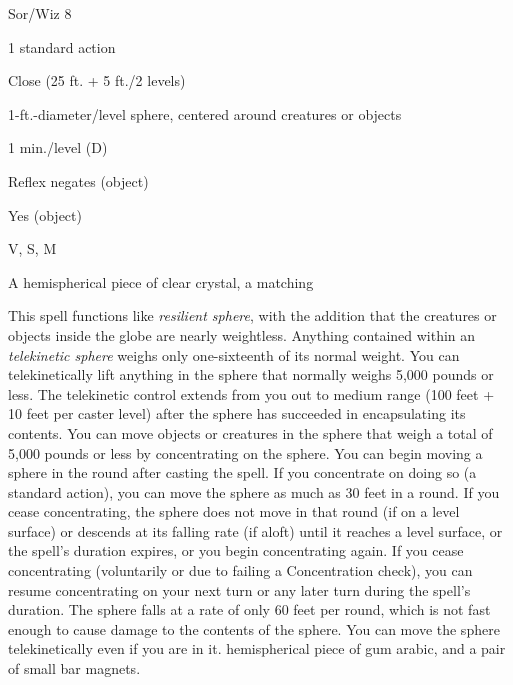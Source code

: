 
\begin{description*}
\item[Level:] Sor/Wiz 8
\item[Casting Time:] 1 standard action
\item[Range:] Close (25 ft. + 5 ft./2 levels)
\item[Effect:] 1-ft.-diameter/level sphere, centered around creatures or objects
\item[Duration:] 1 min./level (D)
\item[Saving Throw:] Reflex negates (object)
\item[Spell Resistance:] Yes (object)
\item[Components:] V, S, M
\item[Arcane Material Component:] A hemispherical piece of clear crystal, a matching
\end{description*}

This spell functions like \textit{resilient sphere}, with the addition that the
creatures or objects inside the globe are nearly weightless. Anything contained
within an \textit{telekinetic sphere} weighs only one-sixteenth of its normal weight.
You can telekinetically lift anything in the sphere that normally weighs 5,000
pounds or less. The telekinetic control extends from you out to medium range (100
feet + 10 feet per caster level) after the sphere has succeeded in encapsulating
its contents.
You can move objects or creatures in the sphere that weigh a total of 5,000 pounds
or less by concentrating on the sphere. You can begin moving a sphere in the round
after casting the spell. If you concentrate on doing so (a standard action), you
can move the sphere as much as 30 feet in a round. If you cease concentrating,
the sphere does not move in that round (if on a level surface) or descends at its
falling rate (if aloft) until it reaches a level surface, or the spell's duration
expires, or you begin concentrating again. If you cease concentrating (voluntarily
or due to failing a Concentration check), you can resume concentrating on your
next turn or any later turn during the spell's duration.
The sphere falls at a rate of only 60 feet per round, which is not fast enough
to cause damage to the contents of the sphere.
You can move the sphere telekinetically even if you are in it.
hemispherical piece of gum arabic, and a pair of small bar magnets.
